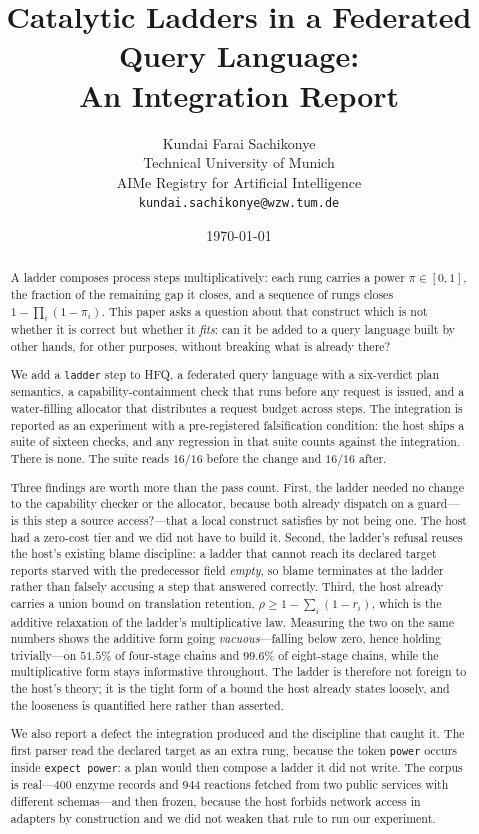 \documentclass[11pt,twocolumn,a4paper]{article}
\title{\textbf{Catalytic Ladders in a Federated Query Language:\\
An Integration Report}}
\author{Kundai Farai Sachikonye\\
\small Technical University of Munich\\
\small AIMe Registry for Artificial Intelligence\\
\small \texttt{kundai.sachikonye@wzw.tum.de}}
\date{\today}
\theoremstyle{plain}
\theoremstyle{definition}
\theoremstyle{remark}
\newcommand{\pow}{\pi}
\newcommand{\vstarve}{\textsf{starved}}
\newcommand{\hfq}[1]{\texttt{#1}}
\begin{document}
\maketitle

\begin{abstract}
A ladder composes process steps multiplicatively: each rung carries a power
$\pow\in[0,1]$, the fraction of the remaining gap it closes, and a sequence of
rungs closes $1-\prod_i(1-\pow_i)$. This paper asks a question about that
construct which is not whether it is correct but whether it \emph{fits}: can it
be added to a query language built by other hands, for other purposes, without
breaking what is already there?

We add a \hfq{ladder} step to HFQ, a federated query language with a six-verdict
plan semantics, a capability-containment check that runs before any request is
issued, and a water-filling allocator that distributes a request budget across
steps. The integration is reported as an experiment with a pre-registered
falsification condition: the host ships a suite of sixteen checks, and any
regression in that suite counts against the integration. There is none. The
suite reads $16/16$ before the change and $16/16$ after.

Three findings are worth more than the pass count. First, the ladder needed no
change to the capability checker or the allocator, because both already
dispatch on a guard---is this step a source access?---that a local construct
satisfies by not being one. The host had a zero-cost tier and we did not have to
build it. Second, the ladder's refusal reuses the host's existing blame
discipline: a ladder that cannot reach its declared target reports
\vstarve{} with the predecessor field \emph{empty}, so blame terminates at the
ladder rather than falsely accusing a step that answered correctly. Third, the
host already carries a union bound on translation retention,
$\rho\ge1-\sum_i(1-r_i)$, which is the additive relaxation of the ladder's
multiplicative law. Measuring the two on the same numbers shows the additive
form going \emph{vacuous}---falling below zero, hence holding trivially---on
$51.5\%$ of four-stage chains and $99.6\%$ of eight-stage chains, while the
multiplicative form stays informative throughout. The ladder is therefore not
foreign to the host's theory; it is the tight form of a bound the host already
states loosely, and the looseness is quantified here rather than asserted.

We also report a defect the integration produced and the discipline that caught
it. The first parser read the declared target as an extra rung, because the
token \hfq{power} occurs inside \hfq{expect power}: a plan would then compose a
ladder it did not write. The corpus is real---$400$ enzyme records and $944$
reactions fetched from two public services with different schemas---and then
frozen, because the host forbids network access in adapters by construction and
we did not weaken that rule to run our experiment.
\end{abstract}
\end{document}
